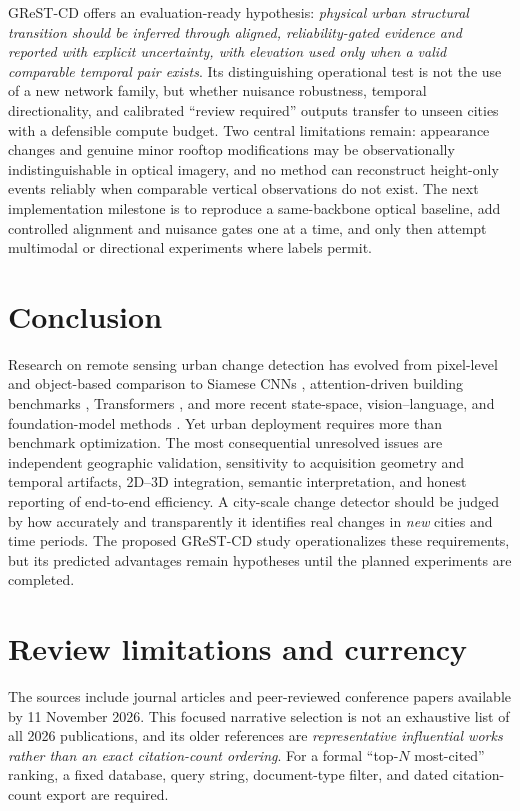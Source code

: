 \documentclass[11pt,a4paper]{article}
\begin{document}
GReST-CD offers an evaluation-ready hypothesis: \emph{physical urban structural transition should be inferred through aligned, reliability-gated evidence and reported with explicit uncertainty, with elevation used only when a valid comparable temporal pair exists}. Its distinguishing operational test is not the use of a new network family, but whether nuisance robustness, temporal directionality, and calibrated ``review required'' outputs transfer to unseen cities with a defensible compute budget. Two central limitations remain: appearance changes and genuine minor rooftop modifications may be observationally indistinguishable in optical imagery, and no method can reconstruct height-only events reliably when comparable vertical observations do not exist. The next implementation milestone is to reproduce a same-backbone optical baseline, add controlled alignment and nuisance gates one at a time, and only then attempt multimodal or directional experiments where labels permit.


\section{Conclusion}

Research on remote sensing urban change detection has evolved from pixel-level and object-based comparison \citep{Hussain2013} to Siamese CNNs \citep{Daudt2018}, attention-driven building benchmarks \citep{ChenShi2020}, Transformers \citep{ChenBIT2022,Bandara2022}, and more recent state-space, vision--language, and foundation-model methods \citep{ChenMamba2024,Dong2024,Jiang2025,ChengHsu2026}. Yet urban deployment requires more than benchmark optimization. The most consequential unresolved issues are independent geographic validation, sensitivity to acquisition geometry and temporal artifacts, 2D--3D integration, semantic interpretation, and honest reporting of end-to-end efficiency. A city-scale change detector should be judged by how accurately and transparently it identifies real changes in \emph{new} cities and time periods. The proposed GReST-CD study operationalizes these requirements, but its predicted advantages remain hypotheses until the planned experiments are completed.

\section*{Review limitations and currency}
The sources include journal articles and peer-reviewed conference papers available by 11 November 2026. This focused narrative selection is not an exhaustive list of all 2026 publications, and its older references are \emph{representative influential works rather than an exact citation-count ordering}. For a formal ``top-$N$ most-cited'' ranking, a fixed database, query string, document-type filter, and dated citation-count export are required.

\printbibliography[title={References}]
\end{document}
